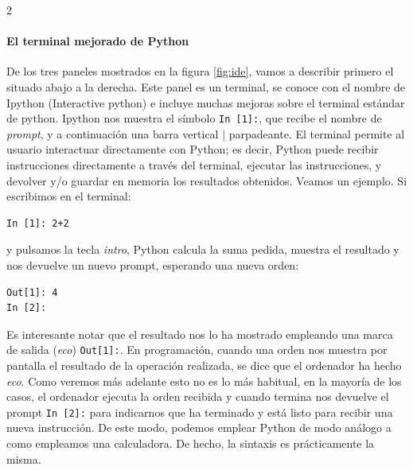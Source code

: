 \begin{paracol}{2}
\paragraph{El terminal mejorado de Python}
De los tres paneles mostrados en la figura \ref{fig:ide}, vamos a describir primero el situado abajo a la derecha. Este panel es un terminal, se conoce con el nombre de Ipython (Interactive python) e incluye muchas mejoras sobre el terminal estándar de python. Ipython nos muestra el símbolo \texttt{In [1]:}, que recibe el nombre de \emph{prompt}, y a continuación una barra vertical $|$ parpadeante. El terminal permite al usuario interactuar directamente con Python; es decir, Python puede recibir instrucciones directamente a través del terminal, ejecutar las instrucciones, y devolver y/o guardar en memoria los resultados obtenidos.  Veamos un ejemplo. Si escribimos en el terminal:
\begin{verbatim}
In [1]: 2+2
\end{verbatim}
y pulsamos la tecla \emph{intro}, Python calcula la suma pedida, muestra el resultado y nos devuelve un nuevo prompt, esperando una nueva orden:
\begin{verbatim}
Out[1]: 4
In [2]:
\end{verbatim}
Es interesante notar que el resultado nos lo ha mostrado empleando una marca de salida (\emph{eco}) \texttt{Out[1]:}. En programación, cuando una orden nos muestra por pantalla el resultado de la operación realizada, se dice que el ordenador ha hecho \emph{eco}. Como veremos más adelante esto no es lo más habitual, en la mayoría de los casos, el ordenador ejecuta la orden recibida y cuando termina nos devuelve el prompt \texttt{In [2]:} para indicarnos que ha terminado y está listo para recibir una nueva instrucción. De este modo, podemos emplear Python de modo análogo a como empleamos una calculadora. De hecho, la sintaxis es prácticamente la misma.
\switchcolumn

\end{paracol}
